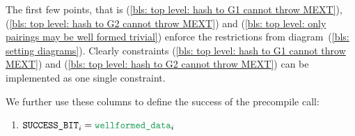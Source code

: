 \saNote{}
The first few points, that is
(\ref{bls: top level: hash to G1 cannot throw MEXT}),
(\ref{bls: top level: hash to G2 cannot throw MEXT}) and
(\ref{bls: top level: only pairings may be well formed trivial})
enforce the restrictions from
diagram~(\ref{bls: setting diagrams}).
Clearly constraints
(\ref{bls: top level: hash to G1 cannot throw MEXT}) and
(\ref{bls: top level: hash to G2 cannot throw MEXT})
can be implemented as one single constraint.

\noindent We further use these columns to define the success of the precompile call:
\begin{enumerate}[resume]
    \item $\blsSuccessBit  _{i} = \locWellformedData _{i}$
\end{enumerate}
